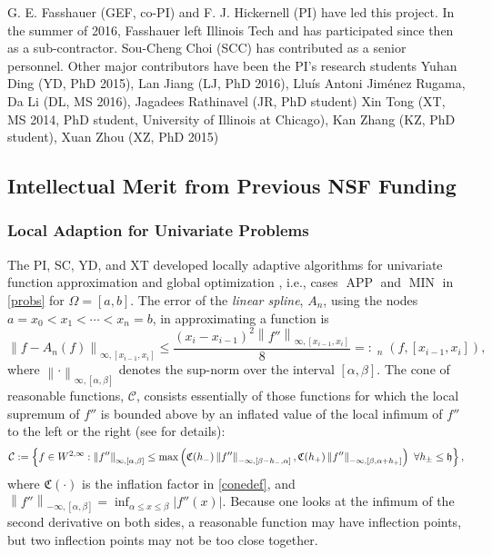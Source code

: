 \documentclass[11pt]{NSFamsart}
\newcommand{\hcut}{\frak{h}}
\DeclareMathOperator{\err}{err}
\DeclareMathOperator{\oerr}{\overline{\err}}
\DeclareMathOperator{\APP}{APP}
\DeclareMathOperator{\OPT}{MIN}
\newcommand{\cc}{\mathcal{C}}
\newcommand{\fC}{\mathfrak{C}}
\def\abs#1{\ensuremath{\left \lvert #1 \right \rvert}}
\newcommand{\norm}[2][{}]{\ensuremath{\left \lVert #2 \right \rVert}_{#1}}
\begin{document}
G. E. Fasshauer (GEF, co-PI) and F. J. Hickernell (PI) have led this project.  In the summer of 
2016, Fasshauer left Illinois Tech and has participated since then as a sub-contractor.  
Sou-Cheng Choi (SCC) has contributed as a senior personnel.  Other major contributors 
have been the PI's research students Yuhan Ding (YD, PhD 2015), Lan Jiang (LJ, PhD 2016), 
Llu\'is Antoni Jim\'enez Rugama, Da Li (DL, MS 2016), Jagadees Rathinavel (JR, PhD student)
Xin Tong (XT, MS 2014, PhD student, University of Illinois at Chicago), Kan Zhang (KZ, PhD 
student), Xuan Zhou (XZ, PhD 2015)


\subsection{Intellectual Merit from Previous NSF Funding}
\label{previousmeritsubsec}

\subsubsection{Local Adaption for Univariate Problems} The PI, SC, YD, and XT developed 
locally adaptive 
algorithms for univariate function 
approximation and 
global optimization \cite{ChoEtal17a}, i.e., cases $\APP$ and $\OPT$ in 
\eqref{probs} for $\Omega = [a,b]$.  
The error of the \emph{linear spline}, $A_n$, using the 
nodes $a = x_0 < x_1 < \cdots < x_n = b$,  in approximating a function is 
\begin{equation} \label{linsplineerror}
\norm[{\infty,[x_{i-1},x_i]}]{f - 
	A_n(f)} \le \frac{(x_i-x_{i-1})^2\norm[\infty,{[x_{i-1},x_i]}]{f''}}{8} =: \oerr_n(f,[x_{i-1},x_i]),
\end{equation}
where $\norm[{\infty,[\alpha,\beta]}]{\cdot}$ denotes the sup-norm over the interval 
$[\alpha,\beta]$.  The cone of reasonable functions, $\cc$, consists essentially of those 
functions for 
which the local supremum of $f''$ is bounded above by an inflated value of the local infimum 
of $f''$ to the left or the right (see \cite{ChoEtal17a} for details):
\[
\cc: = \left \{ f \in W^{2,\infty} : \norm[{\infty,[\alpha,\beta]}]{f''} \le \max\left(\fC(h_{-}) 
\norm[-\infty,{[\beta-h_-,\alpha]}]{f''},\fC(h_{+})
\norm[-\infty,{[\beta, \alpha+h_+]}]{f''}\right) \  \forall h_{\pm} \le \hcut \right\},
\]
where $\fC(\cdot)$ is the inflation factor in \eqref{conedef}, and $\norm[-\infty,{[\alpha, 
\beta]}]{f''} = \inf_{\alpha \le x \le \beta} \abs{f''(x)}$.  Because one looks at the infimum of the 
second derivative on both sides, 
a reasonable function may have inflection points, but two inflection points may not be too 
close together.  
\end{document}

